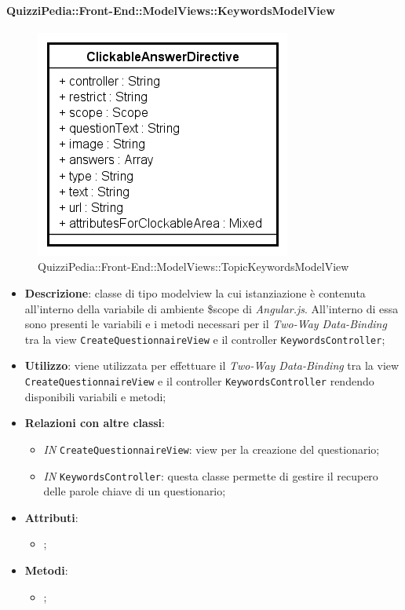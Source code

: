 				\paragraph{QuizziPedia::Front-End::ModelViews::KeywordsModelView}
				
				\label{QuizziPedia::Front-End::ModelViews::TopicKeywordsModelView}
				
				\begin{figure}[ht]
					\centering
					\includegraphics[scale=0.5,keepaspectratio]{UML/Classi/Front-End/QuizziPedia_Front-end_Templates_ClickableAnswerTemplate.png}
					\caption{QuizziPedia::Front-End::ModelViews::TopicKeywordsModelView}
				\end{figure} \FloatBarrier
				
				\begin{itemize}
					\item \textbf{Descrizione}: classe di tipo modelview la cui istanziazione è contenuta all'interno della variabile di ambiente \$scope di \textit{Angular.js}. All'interno di essa sono presenti le variabili e i metodi necessari per il \textit{Two-Way Data-Binding} tra la view \texttt{CreateQuestionnaireView} e il controller \texttt{KeywordsController};
					\item \textbf{Utilizzo}: viene utilizzata per effettuare il \textit{Two-Way Data-Binding} tra la view \texttt{CreateQuestionnaireView} e il controller \texttt{KeywordsController} rendendo disponibili variabili e metodi;
					\item \textbf{Relazioni con altre classi}: 
					\begin{itemize}
						\item \textit{IN} \texttt{CreateQuestionnaireView}: view per la creazione del questionario; 
						\item \textit{IN} \texttt{KeywordsController}: questa classe permette di gestire il recupero delle parole chiave di un questionario;
					\end{itemize}
					\item \textbf{Attributi}: 
					\begin{itemize}
						\item ;
					\end{itemize}
					\item \textbf{Metodi}: 
					\begin{itemize}
						\item ;
					\end{itemize}
				\end{itemize}
				
